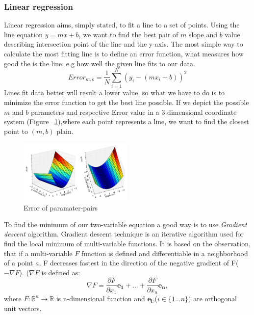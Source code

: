 \subsubsection{Linear regression} \label{linearregression}
Linear regression aims, simply stated, to fit a line to a set of points. Using the line equation $y=mx+b$, we want to find the best pair of $m$ slope and $b$ value describing intersection point of the line and the y-axis. The most simple way  to calculate the most fitting line is to define an error function, what measures how good the is the line, e.g how well the given line fits to our data.
\begin{equation}
Error_{m,b}= \dfrac{1}{N} \sum_{i=1}^{N}(y_i-(mx_i+b))^{2}
\end{equation}
Lines fit data better will result a lower value, so what we have to do is to minimize the error function to get the best line possible. If we depict the possible $m$ and $b$ parameters and respective Error value in a 3 dimensional coordinate system (Figure ~\ref{fig:gradient_descent_error_surface}),where each point represents a line, we want to find the closest point to $(m,b)$ plain. 
\begin{figure}[!ht]
  \centering    
      \includegraphics[width=0.5\textwidth]{figures/gradient_descent_error_surface.png}
  \caption{Error of paramater-pairs\cite{gradientdescent}}
  \label{fig:gradient_descent_error_surface}
\end{figure}

To find the minimum of our two-variable equation a good way is to use \textit{Gradient descent}\cite{wikigraddesc} algorithm. Gradient descent technique is an iterative algorithm used for find the local minimum of multi-variable functions. It is based on the observation, that if a multi-variable $F$ function is defined and differentiable in a neighborhood of a point $a$, F decreases fastest in the direction of the negative gradient of F($-\nabla F$). ($\nabla F$ is defined as: 
\begin{equation}
\nabla F= \dfrac{\partial F}{\partial x_1}\boldsymbol{e_1}+\dots+\dfrac{\partial F}{\partial x_n}\boldsymbol{e_n},
\end{equation} 
where $F:\mathbb{R}^{n}\to 	\mathbb{R}$ is n-dimensional function and $\boldsymbol{e_i}$,($i\in\{1\dots n\})$ are orthogonal unit vectors.

